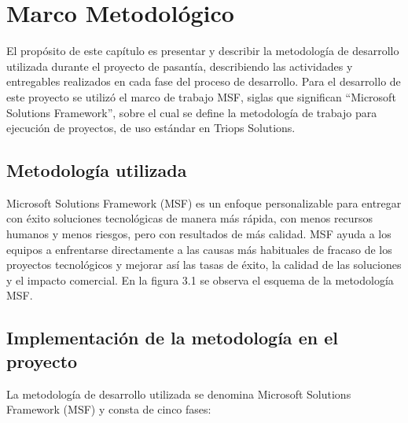 \chapter{Marco Metodológico} \label{chap:Marco Metodológico}

\vspace{5 mm}

		El propósito de este capítulo es presentar y describir la metodología de desarrollo utilizada durante el proyecto de pasantía, describiendo las actividades y entregables realizados en cada fase del proceso de desarrollo. Para el desarrollo de este proyecto se utilizó el marco de trabajo MSF, siglas que significan “Microsoft Solutions Framework”, sobre el cual se define la metodología de trabajo para ejecución de proyectos, de uso estándar en Triops Solutions.

\section{Metodología utilizada} \label{sect:Metodología utilizada}
		Microsoft Solutions Framework (MSF) es un enfoque personalizable para entregar con éxito soluciones tecnológicas de manera más rápida, con menos recursos humanos y menos riesgos, pero con resultados de más calidad. MSF ayuda a los equipos a enfrentarse directamente a las causas más habituales de fracaso de los proyectos tecnológicos y mejorar así las tasas de éxito, la calidad de las soluciones y el impacto comercial. En la figura 3.1 se observa el esquema de la metodología MSF.

\section{Implementación de la metodología en el proyecto} \label{sect:Implementación de la metodología en el proyecto}
		La metodología de desarrollo utilizada se denomina Microsoft Solutions Framework (MSF) y consta de cinco fases:

